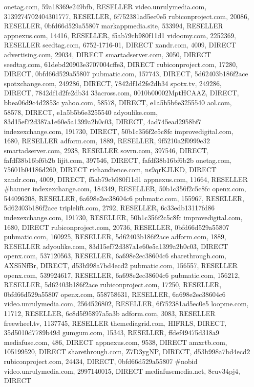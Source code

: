 onetag.com, 59a18369e249bfb, RESELLER
video.unrulymedia.com, 3139274702404301777, RESELLER, 6f752381ad5ec0e5
rubiconproject.com, 20086, RESELLER, 0bfd66d529a55807
markappmedia.site, 533994, RESELLER
appnexus.com, 14416, RESELLER, f5ab79cb980f11d1
vidoomy.com, 2252369, RESELLER
seedtag.com, 6752-1716-01, DIRECT
xandr.com, 4009, DIRECT
advertising.com, 29034, DIRECT
smartadserver.com, 3050, DIRECT
seedtag.com, 61debd20903e3707004cffe3, DIRECT
rubiconproject.com, 17280, DIRECT, 0bfd66d529a55807
pubmatic.com, 157743, DIRECT, 5d62403b186f2ace
spotxchange.com, 249286, DIRECT, 7842df1d2fe2db34
spotx.tv, 249286, DIRECT, 7842df1d2fe2db34
33across.com, 0010b00002MptHCAAZ, DIRECT, bbea06d9c4d2853c
yahoo.com, 58578, DIRECT, e1a5b5b6e3255540
aol.com, 58578, DIRECT, e1a5b5b6e3255540
adyoulike.com, 83d15ef72d387a1e60e5a1399a2b0c03, DIRECT, 4ad745ead2958bf7
indexexchange.com, 191730, DIRECT, 50b1c356f2c5c8fc
improvedigital.com, 1680, RESELLER
adform.com, 1889, RESELLER, 9f5210a2f0999e32
smartadserver.com, 2938, RESELLER
sovrn.com, 397546, DIRECT, fafdf38b16bf6b2b
lijit.com, 397546, DIRECT, fafdf38b16bf6b2b
onetag.com, 75601b04186d260, DIRECT
richaudience.com, ns9qrKJLKD, DIRECT
xandr.com, 4009, DIRECT, f5ab79cb980f11d1
appnexus.com, 11664, RESELLER #banner
indexexchange.com, 184349, RESELLER, 50b1c356f2c5c8fc
openx.com, 544096208, RESELLER, 6a698e2ec38604c6
pubmatic.com, 155967, RESELLER, 5d62403b186f2ace
triplelift.com, 2792, RESELLER, 6c33edb13117fd86
indexexchange.com, 191730, RESELLER, 50b1c356f2c5c8fc
improvedigital.com, 1680, DIRECT
rubiconproject.com, 20736, RESELLER, 0bfd66d529a55807
pubmatic.com, 160925, RESELLER, 5d62403b186f2ace
adform.com, 1889, RESELLER
adyoulike.com, 83d15ef72d387a1e60e5a1399a2b0c03, DIRECT
openx.com, 537120563, RESELLER, 6a698e2ec38604c6
sharethrough.com, AXS5NfBr, DIRECT, d53b998a7bd4ecd2
pubmatic.com, 156557, RESELLER
openx.com, 539924617, RESELLER, 6a698e2ec38604c6
pubmatic.com, 156212, RESELLER, 5d62403b186f2ace
rubiconproject.com, 17250, RESELLER, 0bfd66d529a55807
openx.com, 558758631, RESELLER, 6a698e2ec38604c6
video.unrulymedia.com, 2564526802, RESELLER, 6f752381ad5ec0e5
loopme.com, 11712, RESELLER, 6c8d5f95897a5a3b
adform.com, 3083, RESELLER
freewheel.tv, 1137745, RESELLER
themediagrid.com, HIFRLS, DIRECT, 35d5010d7789b49d
gumgum.com, 15343, RESELLER, ffdef49475d318a9
mediafuse.com, 486, DIRECT
appnexus.com, 9538, DIRECT
amxrtb.com, 105199520, DIRECT
sharethrough.com, Z7D3ygNP, DIRECT, d53b998a7bd4ecd2
rubiconproject.com, 24434, DIRECT, 0bfd66d529a55807 #nobid
video.unrulymedia.com, 2997140015, DIRECT
mediafusemedia.net, 8cuv34pj4, DIRECT
